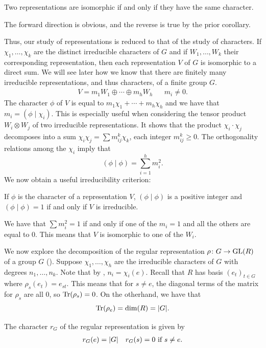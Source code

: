 \documentclass[letterpaper, 11pt, oneside]{book}
\begin{document}
\clearpage

\begin{cor}\label{cor:scalar_counts_num_iso_cor_2}
  Two representations are isomorphic if and only if they have the same character.
\end{cor}
\begin{pf}
  The forward direction is obvious, and the reverse is true by the prior corollary.
\end{pf}

Thus, our study of representations is reduced to that of the study of characters.
If $\chi_{1}, \ldots, \chi_{k}$ are the distinct irreducible characters of $G$ and if $W_{1}, \ldots, W_{k}$ their corresponding representation, then each representation $V$ of $G$ is isomorphic to a direct sum.
We will see later how we know that there are finitely many irreducible representations, and thus characters, of a finite group $G$.
\begin{align*}
  V = m_{1}W_{1} \oplus \cdots \oplus m_{h}W_{h} && m_{i} \neq 0.
\end{align*}
The character $\phi$ of $V$ is equal to $m_{1}\chi_{1} + \cdots + m_{h}\chi_{h}$ and we have that $m_{i} = (\phi \mid \chi_{i})$.
This is especially useful when considering the tensor product $W_{i} \otimes W_{j}$ of two irreducible representations.
It shows that the product $\chi_{i} \cdot \chi_{j}$ decomposes into a sum $\chi_{i} \chi_{j} = \sum m_{ij}^{k} \chi_{k}$, each integer $m_{ij}^{k} \geq 0$.
The orthogonality relations among the $\chi_{i}$ imply that
\[
  (\phi \mid \phi) = \sum_{i = 1}^{h} m_{i}^{2}.
\]
We now obtain a useful irreducibility criterion:
\begin{thrm}\label{thrm:irreducibility_criterion}
  If $\phi$ is the character of a representation $V$, $(\phi \mid \phi)$ is a positive integer and $(\phi \mid \phi) = 1$ if and only if $V$ is irreducible.
\end{thrm}
\begin{pf}
  We have that $\sum m_{i}^{2} = 1$ if and only if one of the $m_{i} = 1$ and all the others are equal to $0$.
  This means that $V$ is isomorphic to one of the $W_{i}$.
\end{pf}

We now explore the decomposition of the regular representation $\rho\colon G \to \operatorname{GL}(R)$ of a group $G$ ().
Suppose $\chi_{1}, \ldots, \chi_{h}$ are the irreducible characters of $G$ with degrees $n_{1}, \ldots, n_{k}$.
Note that by , $n_{i} = \chi_{i}(e)$.
Recall that $R$ has basis $(e_{t})_{t \in G}$ where $\rho_{s}(e_{t}) = e_{st}$.
This means that for $s \neq e$, the diagonal terms of the matrix for $\rho_{s}$ are all $0$, so $\Tr(\rho_{s}) = 0$.
On the otherhand, we have that
\[
  \Tr(\rho_{e}) = \dim(R) = \abs{G}.
\]
\begin{prop}\label{prop:char_reg_rep}
  The character $r_{G}$ of the regular representation is given by
  \begin{align*}
    r_{G}(e) = \abs{G} && r_{G}(s) = 0 \text{ if } s \neq e.
  \end{align*}
\end{prop}
\end{document}
